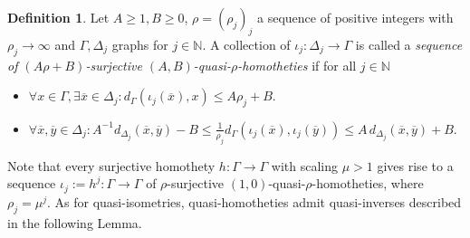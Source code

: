 \documentclass{amsart}
\theoremstyle{definition}
\newtheorem{definition}[theorem]{Definition}
\theoremstyle{remark}
\theoremstyle{remark}
\theoremstyle{definition}
\renewcommand{\leq}{\leqslant}
\renewcommand{\geq}{\geqslant}
\begin{document}
\begin{definition}\label{def:quasi-homothety-seq}
    Let $A\geq 1, B\geq 0$, $\rho = (\rho_j)_j$ a sequence of positive integers with $\rho_j \to \infty$ and $\Gamma,\Delta_j$ graphs for $j\in \mathbb{N}$. A collection of $\iota_j \colon \Delta_j \to \Gamma$ is called a \emph{sequence of $(A\rho + B)$-surjective $(A,B)$-quasi-$\rho$-homotheties} if for all $j\in \mathbb{N}$
\begin{itemize}
    \item [(1)]  $\forall x \in \Gamma , \exists \overline{x} \in \Delta_j \colon
    d_{\Gamma}(\iota_j(\overline{x}),x) \leq A\rho_j + B$.

    \item [(2)] $\forall \overline{x}, \overline{y} \in \Delta_j \colon
    A^{-1}d_{\Delta_j}(\overline{x},\overline{y})- B \leq \frac{1}{\rho_j}d_{\Gamma}(\iota_j(\overline{x}), \iota_j(\overline{y})) \leq A \, d_{\Delta_j}(\overline{x},\overline{y}) + B $.
\end{itemize}
\end{definition}
Note that every surjective homothety $h \colon \Gamma \to \Gamma$ with scaling $\mu >1$ gives rise to a sequence $\iota_j:=h^j \colon \Gamma \to \Gamma$ of $\rho$-surjective $(1,0)$-quasi-$\rho$-homotheties, where $\rho_j = \mu^j$. As for quasi-isometries, quasi-homotheties admit quasi-inverses described in the following Lemma.
\end{document}
